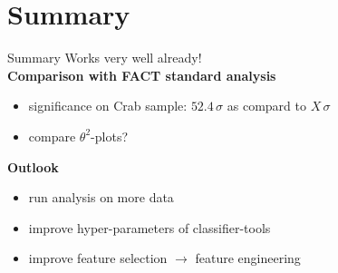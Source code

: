 \section{Summary}

\begin{frame}[t]{Summary}
Works very well already! \\
\vspace{10px}
\textbf{{\color{tugreen} Comparison with FACT standard analysis}}
\begin{itemize}
    \item significance on Crab sample: $52.4\,\sigma$ as compard to $X\,\sigma$
    \item compare $\theta^2$-plots?
\end{itemize}
\vspace{20px}
\textbf{{\color{tugreen} Outlook}}
\begin{itemize}
    \item run analysis on more data
    \item improve hyper-parameters of classifier-tools
    \item improve feature selection $\rightarrow$ feature engineering
\end{itemize}
\end{frame}


% 



